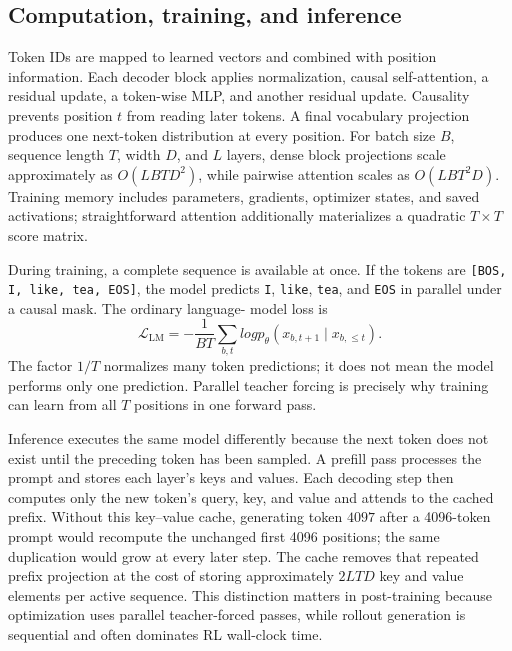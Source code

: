 \subsection{Computation, training, and inference}

Token IDs are mapped to learned vectors and combined with position information. Each
decoder block applies normalization, causal self-attention, a residual update, a token-wise
MLP, and another residual update. Causality prevents position $t$ from reading later
tokens. A final vocabulary projection produces one next-token distribution at every
position. For batch size $B$, sequence length $T$, width $D$, and $L$ layers, dense block
projections scale approximately as $O(LBTD^2)$, while pairwise attention scales as
$O(LBT^2D)$. Training memory includes parameters, gradients, optimizer states, and saved
activations; straightforward attention additionally materializes a quadratic $T\times T$
score matrix.

During training, a complete sequence is available at once. If the tokens are
\texttt{[BOS, I, like, tea, EOS]}, the model predicts \texttt{I}, \texttt{like},
\texttt{tea}, and \texttt{EOS} in parallel under a causal mask. The ordinary language-
model loss is
\begin{equation}
  \mathcal{L}_{\mathrm{LM}}
  =-\frac{1}{BT}\sum_{b,t}log p_\theta(x_{b,t+1}\mid x_{b,\leq t}).
  \label{eq:compact-next-token-loss}
\end{equation}
The factor $1/T$ normalizes many token predictions; it does not mean the model performs
only one prediction. Parallel teacher forcing is precisely why training can learn from all
$T$ positions in one forward pass.

Inference executes the same model differently because the next token does not exist until
the preceding token has been sampled. A prefill pass processes the prompt and stores each
layer's keys and values. Each decoding step then computes only the new token's query, key,
and value and attends to the cached prefix. Without this key--value cache, generating token
$4097$ after a 4096-token prompt would recompute the unchanged first 4096 positions; the
same duplication would grow at every later step. The cache removes that repeated prefix
projection at the cost of storing approximately $2LTD$ key and value elements per active
sequence. This distinction matters in post-training because optimization uses parallel
teacher-forced passes, while rollout generation is sequential and often dominates RL
wall-clock time.
